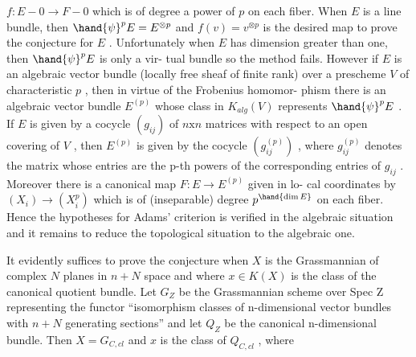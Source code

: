 $f:E - 0 \rightarrow F - 0$ which is of degree a power of $p$ on each fiber.
When $E$ is a line bundle, then $\hand{\psi}^pE = E^{\otimes p}$ and $f(v) = v^{\otimes p}$ is
the desired map to prove the conjecture for $E$ . Unfortunately
when $E$ has dimension greater than one, then $\hand{\psi}^pE$ is only a vir-%
tual bundle so the method fails. However if $E$ is an algebraic
vector bundle (locally free sheaf of finite rank) over a prescheme
$V$ of characteristic $p$ , then in virtue of the Frobenius homomor-%
phism there is an algebraic vector bundle $E^{(p)}$ whose class in
$K_{alg}(V)$ represents $\hand{\psi}^pE$ .\hand{*} If $E$ is given by a cocycle $(g_{ij})$ of
$n\mathrm{x}n$ matrices with respect to an open covering of $V$ , then $E^{(p)}$
is given by the cocycle $(g_{ij}^{(p)})$ , where $g_{ij}^{(p)}$ denotes the matrix
whose entries are the p-th powers of the corresponding entries of
$g_{ij}$ . Moreover there is a canonical map $F:E \rightarrow E^{(p)}$ given in lo-%
cal coordinates by $(X_i) \rightarrow (X_i^p)$ which is of (inseparable) degree
$p^{\hand{\dim E}}$ on each fiber. Hence the hypotheses for Adams' criterion is
verified in the algebraic situation and it remains to reduce the
topological situation to the algebraic one.

It evidently suffices to prove the conjecture when $X$ is the
Grassmannian of complex $N$ planes in $n + N$ space and where
$x \in K(X)$ is the class of the canonical quotient bundle. Let $G_Z$
be the Grassmannian scheme over Spec Z representing the functor
``isomorphism classes of n-dimensional vector bundles with $n + N$
generating sections'' and let $Q_Z$ be the canonical n-dimensional
bundle. Then $X = G_{C,cl}$ and $x$ is the class of $Q_{C,cl}$ , where


